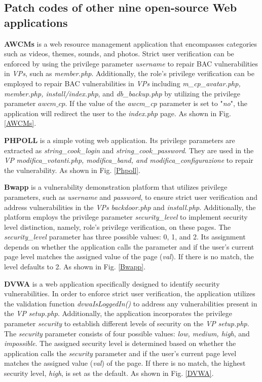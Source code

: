 \documentclass[10pt,journal,compsoc]{IEEEtran}
\begin{document}
\begin{CJK}{UTF8}{gbsn}
\appendix
\section{Patch codes of other nine open-source Web applications}
\label{appendix:Repair code of other nine open-source Web applications}

\textbf{AWCMs} is a web resource management application that encompasses categories such as videos, themes, sounds, and photos. Strict user verification can be enforced by using the privilege parameter \textit{username} to repair BAC vulnerabilities in \textit{VPs}, such as \textit{member.php}. Additionally, the role's privilege verification can be employed to repair BAC vulnerabilities in \textit{VPs} including \textit{m\_cp\_avatar.php, member.php, install/index.php}, and \textit{db\_backup.php} by utilizing the privilege parameter $awcm\_cp$. If the value of the \textit{awcm\_cp} parameter is set to "\textit{no}", the application will redirect the user to the \textit{index.php} page. As shown in Fig.\ref{AWCMs}.

\textbf{PHPOLL} is a simple voting web application. Its privilege parameters are extracted as \textit{string\_cook\_login} and \textit{string\_cook\_password}. They are used in the \textit{VP} \textit{modifica\_votanti.php, modifica\_band, and modifica\_configurazione} to repair the vulnerability. As shown in Fig. \ref{Phpoll}.

\textbf{Bwapp} is a vulnerability demonstration platform that utilizes privilege parameters, such as \textit{username} and \textit{password}, to ensure strict user verification and address vulnerabilities in the \textit{VPs} \textit{backdoor.php} and \textit{install.php}. Additionally, the platform employs the privilege parameter \textit{security\_level} to implement security level distinction, namely, role's privilege verification, on these pages. The \textit{security\_level} parameter has three possible values: 0, 1, and 2. Its assignment depends on whether the application calls the parameter and if the user's current page level matches the assigned value of the page (\textit{val}). If there is no match, the level defaults to 2. As shown in Fig. \ref{Bwapp}.

\textbf{DVWA} is a web application specifically designed to identify security vulnerabilities. In order to enforce strict user verification, the application utilizes the validation function \textit{dvwaIsLoggedIn()} to address any vulnerabilities present in the \textit{VP} \textit{setup.php}. Additionally, the application incorporates the privilege parameter \textit{security} to establish different levels of security on the \textit{VP} \textit{setup.php}. The \textit{security} parameter consists of four possible values: \textit{low, medium, high}, and \textit{impossible}. The assigned security level is determined based on whether the application calls the \textit{security} parameter and if the user's current page level matches the assigned value (\textit{val}) of the page. If there is no match, the highest security level, \textit{high}, is set as the default. As shown in Fig. \ref{DVWA}.


\end{CJK}
\end{document}
